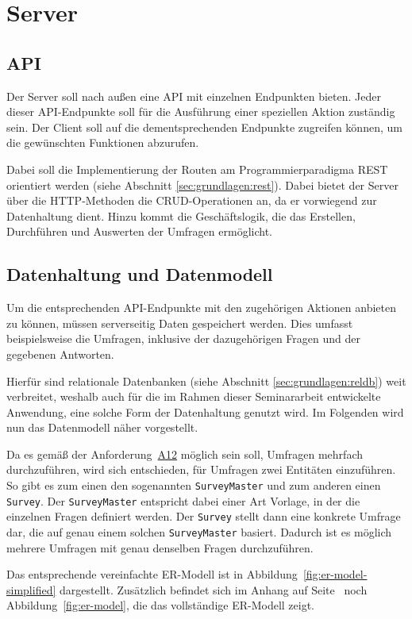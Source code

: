 \section{Server}
\label{sec:konzept:server}
\subsection{\acl{API}}
Der Server soll nach außen eine \acs{API} mit einzelnen Endpunkten bieten.
Jeder dieser \acs{API}-Endpunkte soll für die Ausführung einer speziellen Aktion zuständig sein.
Der Client soll auf die dementsprechenden Endpunkte zugreifen können, um die gewünschten Funktionen abzurufen.

Dabei soll die Implementierung der Routen am Programmierparadigma \acs{REST} orientiert werden (siehe Abschnitt \ref{sec:grundlagen:rest}).
Dabei bietet der Server über die \acs{HTTP}-Methoden die \acs{CRUD}-Operationen an, da er vorwiegend zur Datenhaltung dient.
Hinzu kommt die Geschäftslogik, die das Erstellen, Durchführen und Auswerten der Umfragen ermöglicht.

\subsection{Datenhaltung und Datenmodell}
Um die entsprechenden \acs{API}-Endpunkte mit den zugehörigen Aktionen anbieten zu können, müssen serverseitig Daten gespeichert werden.
Dies umfasst beispielsweise die Umfragen, inklusive der dazugehörigen Fragen und der gegebenen Antworten.

Hierfür sind relationale Datenbanken (siehe Abschnitt \ref{sec:grundlagen:reldb}) weit verbreitet, weshalb auch für die im Rahmen dieser Seminararbeit entwickelte Anwendung, eine solche Form der Datenhaltung genutzt wird.
Im Folgenden wird nun das Datenmodell näher vorgestellt.

Da es gemäß der Anforderung~\hyperref[Anf:A12]{A12} möglich sein soll, Umfragen mehrfach durchzuführen, wird sich entschieden, für Umfragen zwei Entitäten einzuführen.
So gibt es zum einen den sogenannten \texttt{SurveyMaster} und zum anderen einen \texttt{Survey}.
Der \texttt{SurveyMaster} entspricht dabei einer Art Vorlage, in der die einzelnen Fragen definiert werden.
Der \texttt{Survey} stellt dann eine konkrete Umfrage dar, die auf genau einem solchen \texttt{SurveyMaster} basiert.
Dadurch ist es möglich mehrere Umfragen mit genau denselben Fragen durchzuführen.

Das entsprechende vereinfachte \acs{ER-Modell} ist in Abbildung~\vref{fig:er-model-simplified} dargestellt.
Zusätzlich befindet sich im Anhang auf Seite~\pageref{fig:er-model} noch Abbildung~\ref{fig:er-model}, die das vollständige \acs{ER-Modell} zeigt.

